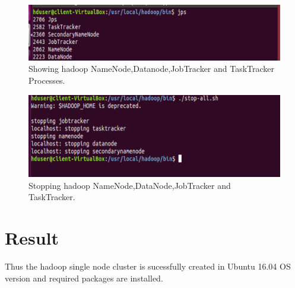 \documentclass[a4paper,10pt]{article}
\begin{document}
\begin{figure}[h]
	\includegraphics[scale=0.55,center]{exptTwoScreenShot/fig12.png}
	\caption{Showing hadoop NameNode,Datanode,JobTracker and TaskTracker Processes.}
	\label{fig:12}
\end{figure}

\newpage
\begin{figure}[h]
	\includegraphics[scale=0.40,center]{exptTwoScreenShot/fig13.png}
	\caption{Stopping hadoop NameNode,DataNode,JobTracker and TaskTracker.}
\end{figure}


\section{Result}
Thus the hadoop single node cluster is sucessfully created in Ubuntu 16.04 OS version and required packages are installed.
\end{document}
